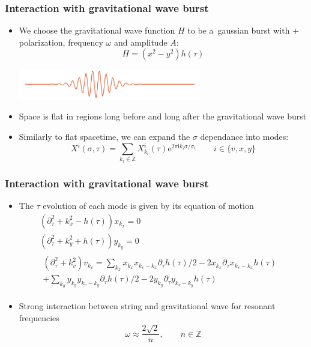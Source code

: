 \documentclass[11pt]{beamer}
\newcommand{\Zbb}{\mathbb{Z}}
\newcommand{\difs}[3][]{\partial_{#3}^{#1}{#2}}
\newcommand{\me}{\mathrm{e}}
\newcommand{\mi}{\mathrm{i}}
\newcommand{\lp}{\left(}
\newcommand{\rp}{\right)}
\begin{document}
\begin{frame}
	\frametitle{Interaction with gravitational wave burst}
	\begin{itemize}
	\item We choose the gravitational wave function $H$ to be a~gaussian burst with $+$ polarization, frequency $\omega$ and amplitude $A$:
	$$
	H = (x^2 - y^2) h(\tau)
	$$
	\begin{center}
	\includegraphics[width=8cm]{grav_wave_profile.pdf}
	\end{center}
	\item Space is flat in regions long before and long after the gravitational wave burst
	\pause
	\item Similarly to flat spacetime, we can expand the $\sigma$ dependance into modes:
	$$
	X^i(\sigma, \tau) = \sum\limits_{k_i \in \Zbb} X^i_{k_i}(\tau) \me^{2 \pi \mi k_i \sigma/\sigma_1} \qquad i \in \{v, x, y\}
	$$
	\end{itemize}	
\end{frame}

\begin{frame}
	\frametitle{Interaction with gravitational wave burst}
	\begin{itemize}
		\item The $\tau$ evolution of each mode is given by its equation of motion
		$$
		\begin{aligned}
		\lp \difs[2]{}{\tau} + k_x^2 - h(\tau) \rp x_{k_x} = 0 & \\
		\lp \difs[2]{}{\tau} + k_y^2 + h(\tau) \rp y_{k_y} = 0 & \\
		\begin{aligned}
		\lp \difs[2]{}{\tau} + k_v^2 \rp v_{k_v} = \sum\limits_{k_x}  x_{k_x} x_{k_v-k_x} \difs {h(\tau)} {\tau}/2 - 2 x_{k_x} \difs {x_{k_v-k_x}} {\tau} h(\tau) \\
		+ \sum\limits_{k_y}  y_{k_y} y_{k_v-k_y} \difs {h(\tau)} {\tau}/2 - 2 y_{k_y} \difs {y_{k_v-k_y}} {\tau} h(\tau)
		\end{aligned} &
		\end{aligned}
		$$
		\pause
		\item Strong interaction between string and gravitational wave for resonant frequencies
		$$
		\omega \approx \frac{2 \sqrt{2}}{n}, \qquad n \in \Zbb
		$$
	\end{itemize}
\end{frame}
\end{document}
